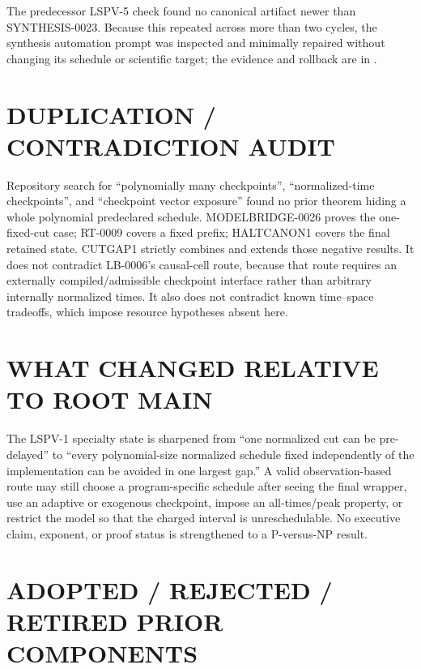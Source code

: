 \documentclass[11pt]{article}
\begin{document}
The predecessor LSPV-5 check found no canonical artifact newer than SYNTHESIS-0023.
Because this repeated across more than two cycles, the synthesis automation prompt was
inspected and minimally repaired without changing its schedule or scientific target;
the evidence and rollback are in
.

\section{DUPLICATION / CONTRADICTION AUDIT}

Repository search for ``polynomially many checkpoints'', ``normalized-time checkpoints'',
and ``checkpoint vector exposure'' found no prior theorem hiding a whole polynomial
predeclared schedule.  MODELBRIDGE-0026 proves the one-fixed-cut case; RT-0009 covers a
fixed prefix; HALTCANON1 covers the final retained state.  CUTGAP1 strictly combines and
extends those negative results.  It does not contradict LB-0006's causal-cell route,
because that route requires an externally compiled/admissible checkpoint interface rather
than arbitrary internally normalized times.  It also does not contradict known
time--space tradeoffs, which impose resource hypotheses absent here.

\section{WHAT CHANGED RELATIVE TO ROOT MAIN}

The LSPV-1 specialty state is sharpened from ``one normalized cut can be pre-delayed'' to
``every polynomial-size normalized schedule fixed independently of the implementation can
be avoided in one largest gap.''  A valid observation-based route may still choose a
program-specific schedule after seeing the final wrapper, use an adaptive or exogenous
checkpoint, impose an all-times/peak property, or restrict the model so that the charged
interval is unreschedulable.  No executive claim, exponent, or proof status is
strengthened to a P-versus-NP result.

\section{ADOPTED / REJECTED / RETIRED PRIOR COMPONENTS}
\end{document}
